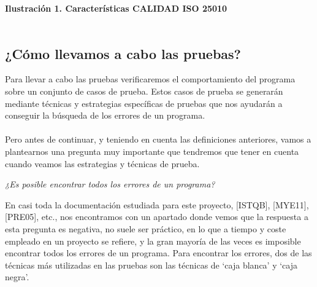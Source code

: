 \documentclass[12pt,letterpaper]{article}
\begin{document}
\textbf{Ilustración 1. Características CALIDAD ISO 25010}
\\
\\

\subsection{¿Cómo llevamos a cabo las pruebas?}
Para llevar a cabo las pruebas verificaremos el comportamiento del programa sobre un conjunto de casos de prueba. Estos casos de prueba se generarán mediante técnicas y estrategias específicas de pruebas que nos ayudarán a conseguir la búsqueda de los errores de un programa.
\\
\\
Pero antes de continuar, y teniendo en cuenta las definiciones anteriores, vamos a plantearnos una pregunta muy importante que tendremos que tener en cuenta cuando veamos las estrategias y técnicas de prueba.
\begin{center}
    \textit{¿Es posible encontrar todos los errores de un programa?}
\end{center}

En casi toda la documentación estudiada para este proyecto, [ISTQB], [MYE11], [PRE05], etc., nos encontramos con un apartado donde vemos que la respuesta a esta pregunta es negativa, no suele ser práctico, en lo que a tiempo y coste empleado en un proyecto se refiere, y la gran mayoría de las veces es imposible encontrar todos los errores de un programa.
Para encontrar los errores, dos de las técnicas más utilizadas en las pruebas son las técnicas de ‘caja blanca’ y ‘caja negra’.
\\
\\
 
\end{document}
